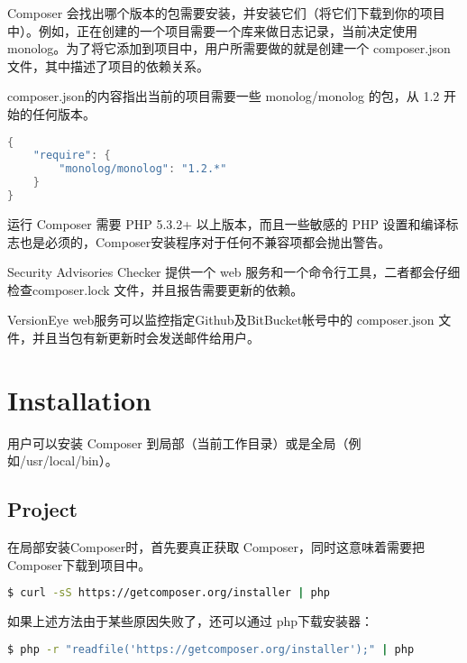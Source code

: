 Composer 会找出哪个版本的包需要安装，并安装它们（将它们下载到你的项目中）。例如，正在创建的一个项目需要一个库来做日志记录，当前决定使用 monolog。为了将它添加到项目中，用户所需要做的就是创建一个 composer.json 文件，其中描述了项目的依赖关系。

composer.json的内容指出当前的项目需要一些 monolog/monolog 的包，从 1.2 开始的任何版本。

\begin{lstlisting}[language=Java]
{
    "require": {
        "monolog/monolog": "1.2.*"
    }
}
\end{lstlisting}

运行 Composer 需要 PHP 5.3.2+ 以上版本，而且一些敏感的 PHP 设置和编译标志也是必须的，Composer安装程序对于任何不兼容项都会抛出警告。



\begin{compactitem}
\item Security Advisories Checker 提供一个 web 服务和一个命令行工具，二者都会仔细检查composer.lock 文件，并且报告需要更新的依赖。
\item VersionEye web服务可以监控指定Github及BitBucket帐号中的 composer.json 文件，并且当包有新更新时会发送邮件给用户。
\end{compactitem}






\section{Installation}

用户可以安装 Composer 到局部（当前工作目录）或是全局（例如/usr/local/bin）。

\subsection{Project}

在局部安装Composer时，首先要真正获取 Composer，同时这意味着需要把Composer下载到项目中。

\begin{lstlisting}[language=bash]
$ curl -sS https://getcomposer.org/installer | php
\end{lstlisting}

如果上述方法由于某些原因失败了，还可以通过 php下载安装器：

\begin{lstlisting}[language=bash]
$ php -r "readfile('https://getcomposer.org/installer');" | php
\end{lstlisting}

